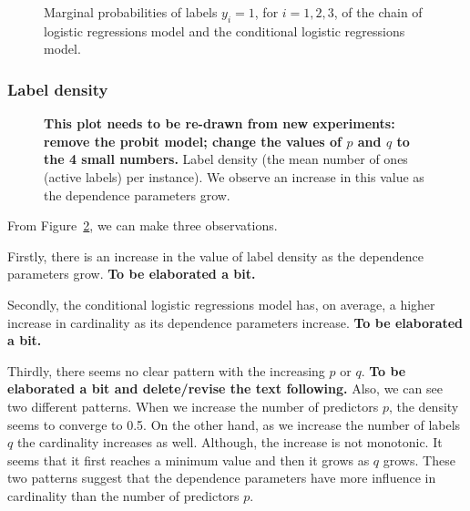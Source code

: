 \documentclass[review]{elsarticle}
\begin{document}
{\begin{figure}[H]
    \begin{center}
		\end{center}
    \caption{Marginal probabilities of labels $y_{i}=1$, for $i=1, 2, 3$, of the chain of logistic regressions model and the conditional logistic regressions model.}
    \label{fig:results:imb:toy}
\end{figure}


\subsubsection{Label density}

\begin{figure}[H]
    \begin{center}
		\end{center}
    \caption{{\bf This plot needs to be re-drawn from new experiments: remove the probit model; change the values of $p$ and $q$ to the 4 small numbers.} Label density (the mean number of ones (active labels) per instance). We observe an increase in this value as the dependence parameters grow.}
    \label{fig:results:density}
\end{figure}

From Figure~\ref{fig:results:density}, we can make three observations.

Firstly, there is an increase in the value of label density as the dependence parameters grow. {\bf To be elaborated a bit.}

Secondly, the conditional logistic regressions model has, on average, a higher increase in cardinality as its dependence parameters increase.  {\bf To be elaborated a bit.}

Thirdly, there seems no clear pattern with the increasing $p$ or $q$.  {\bf To be elaborated a bit and delete/revise the text following.}  Also, we can see two different patterns. When we increase the number of predictors $p$, the density seems to converge to 0.5. On the other hand, as we increase the number of labels $q$ the cardinality increases as well. Although, the increase is not monotonic. It seems that it first reaches a minimum value and then it grows as $q$ grows. These two patterns suggest that the dependence parameters have more influence in cardinality than the number of predictors $p$.


}
\end{document}
